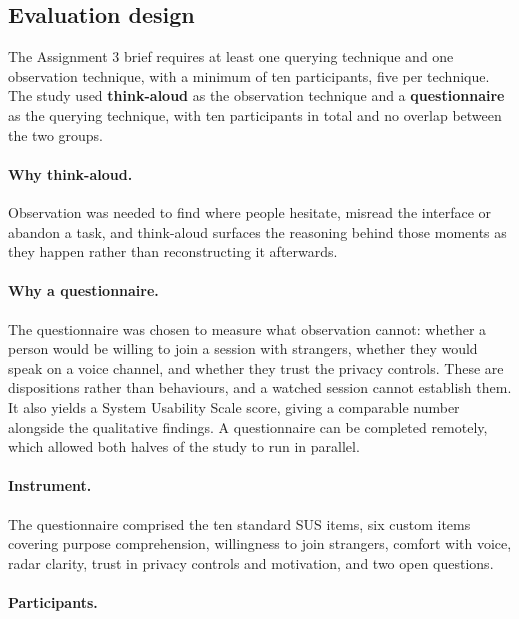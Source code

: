 
\subsection{Evaluation design}

The Assignment 3 brief requires at least one querying technique and one observation technique, with
a minimum of ten participants, five per technique. The study used \textbf{think-aloud} as the
observation technique and a \textbf{questionnaire} as the querying technique, with ten participants
in total and no overlap between the two groups.

\paragraph{Why think-aloud.} Observation was needed to find where people hesitate, misread the
interface or abandon a task, and think-aloud surfaces the reasoning behind those moments as they
happen rather than reconstructing it afterwards.

\paragraph{Why a questionnaire.} The questionnaire was chosen to measure what observation cannot:
whether a person would be willing to join a session with strangers, whether they would speak on a
voice channel, and whether they trust the privacy controls. These are dispositions rather than
behaviours, and a watched session cannot establish them. It also yields a System Usability Scale
score, giving a comparable number alongside the qualitative findings. A questionnaire can be
completed remotely, which allowed both halves of the study to run in parallel.

\paragraph{Instrument.} The questionnaire comprised the ten standard SUS items, six custom items
covering purpose comprehension, willingness to join strangers, comfort with voice, radar clarity,
trust in privacy controls and motivation, and two open questions.

\paragraph{Participants.} 

